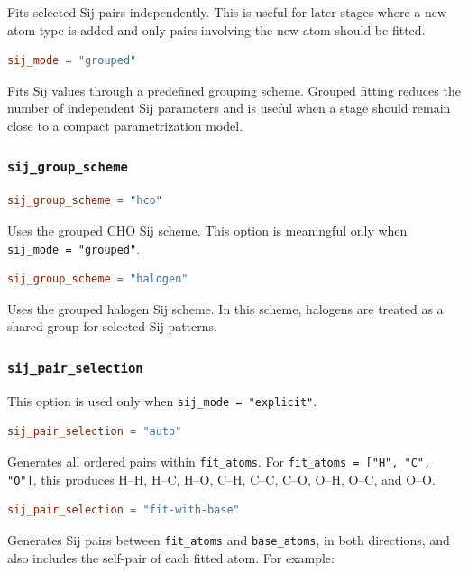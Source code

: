 \documentclass[11pt]{article}
\begin{document}
Fits selected Sij pairs independently. This is useful for later stages where a
new atom type is added and only pairs involving the new atom should be fitted.

\begin{lstlisting}[language=toml]
sij_mode = "grouped"
\end{lstlisting}

Fits Sij values through a predefined grouping scheme. Grouped fitting reduces
the number of independent Sij parameters and is useful when a stage should
remain close to a compact parametrization model.

\subsubsection{\texttt{sij\_group\_scheme}}

\begin{lstlisting}[language=toml]
sij_group_scheme = "hco"
\end{lstlisting}

Uses the grouped CHO Sij scheme. This option is meaningful only when
\texttt{sij\_mode = "grouped"}.

\begin{lstlisting}[language=toml]
sij_group_scheme = "halogen"
\end{lstlisting}

Uses the grouped halogen Sij scheme. In this scheme, halogens are treated as a
shared group for selected Sij patterns.

\subsubsection{\texttt{sij\_pair\_selection}}

This option is used only when \texttt{sij\_mode = "explicit"}.

\begin{lstlisting}[language=toml]
sij_pair_selection = "auto"
\end{lstlisting}

Generates all ordered pairs within \texttt{fit\_atoms}. For
\texttt{fit\_atoms = ["H", "C", "O"]}, this produces H--H, H--C, H--O, C--H,
C--C, C--O, O--H, O--C, and O--O.

\begin{lstlisting}[language=toml]
sij_pair_selection = "fit-with-base"
\end{lstlisting}

Generates Sij pairs between \texttt{fit\_atoms} and \texttt{base\_atoms}, in
both directions, and also includes the self-pair of each fitted atom. For
example:
\end{document}
